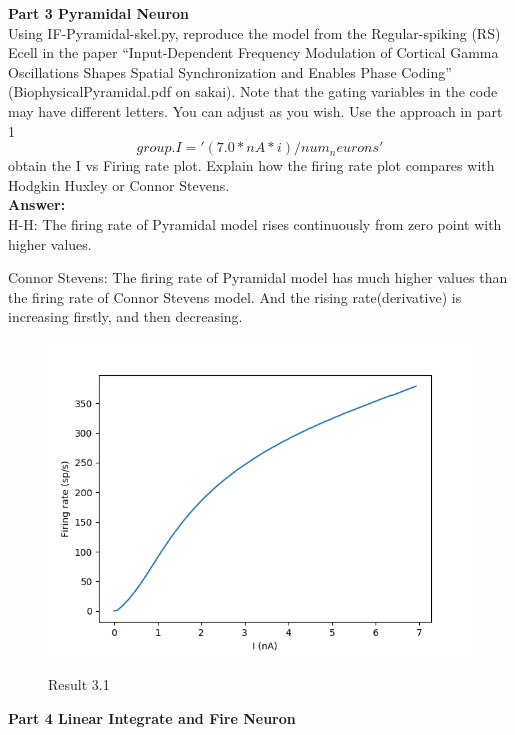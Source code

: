 \documentclass[12pt]{article}
\begin{document}
\newpage
\textbf{Part 3 Pyramidal Neuron}
\\

Using	IF-Pyramidal-skel.py,	reproduce	the	model	from the	Regular-spiking	(RS)	Ecell
in	the	paper	“Input-Dependent	Frequency	Modulation	of	Cortical Gamma	
Oscillations	Shapes	Spatial Synchronization	and	Enables	Phase	Coding”
(BiophysicalPyramidal.pdf	on	sakai).	Note	that	the	gating	variables	in	the	code	may	
have	different	letters.	You	can	adjust	as	you	wish.	
Use	the	approach	in	part	1	
$$group.I	=	'(7.0*nA	*	i)	/	num_neurons'$$
obtain	the	I	vs	Firing	rate	plot.
Explain	how	the	firing	rate	plot	compares	with	Hodgkin	Huxley	or	Connor	Stevens.
\\

\textbf{Answer:} 
\\

	H-H: The firing rate of Pyramidal model rises continuously from zero point with higher values. 
	
	Connor Stevens: The firing rate of Pyramidal model has much higher values than the firing rate of Connor Stevens model. And the rising rate(derivative) is increasing firstly, and then decreasing.
 \begin{figure}[H]
  \centering
  \includegraphics[width=.8\textwidth]{h3_p1.png} %
  \label{img} %
  \caption{Result 3.1}
\end{figure}

\newpage
\textbf{Part 4 Linear Integrate and Fire Neuron}
\\
\end{document}
